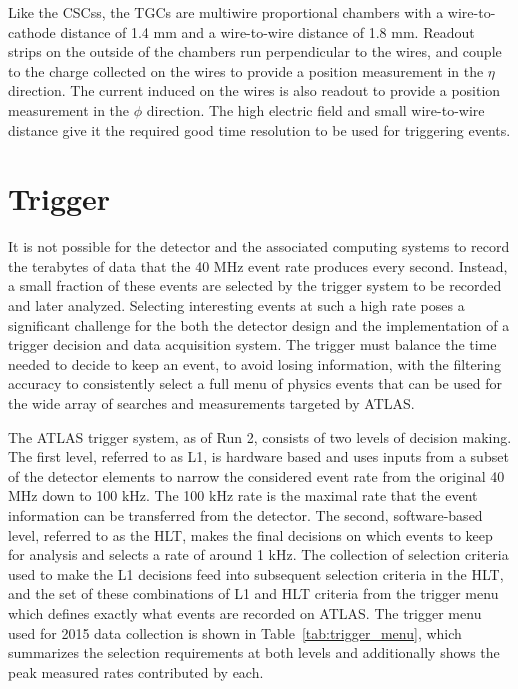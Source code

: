 Like the \acp{CSC}s, the \acp{TGC} are multiwire proportional chambers with a wire-to-cathode distance of 1.4 mm and a wire-to-wire distance of 1.8 mm.
Readout strips on the outside of the chambers run perpendicular to the wires, and couple to the charge collected on the wires to provide a position measurement in the $\eta$ direction.
The current induced on the wires is also readout to provide a position measurement in the $\phi$ direction.
The high electric field and small wire-to-wire distance give it the required good time resolution to be used for triggering events. 


\section{Trigger}
\label{sec:trigger}

It is not possible for the detector and the associated computing systems to record the terabytes of data that the 40 MHz event rate produces every second.
Instead, a small fraction of these events are selected by the trigger system to be recorded and later analyzed.
Selecting interesting events at such a high rate poses a significant challenge for the both the detector design and the implementation of a trigger decision and data acquisition system.
The trigger must balance the time needed to decide to keep an event, to avoid losing information, with the filtering accuracy to consistently select a full menu of physics events that can be used for the wide array of searches and measurements targeted by \ac{ATLAS}. 

The \ac{ATLAS} trigger system, as of Run 2, consists of two levels of decision making. 
The first level, referred to as L1, is hardware based and uses inputs from a subset of the detector elements to narrow the considered event rate from the original 40 MHz down to 100 kHz.
The 100 kHz rate is the maximal rate that the event information can be transferred from the detector.
The second, software-based level, referred to as the \ac{HLT}, makes the final decisions on which events to keep for analysis and selects a rate of around 1 kHz.
The collection of selection criteria used to make the L1 decisions feed into subsequent selection criteria in the \ac{HLT}, and the set of these combinations of L1 and \ac{HLT} criteria from the trigger menu which defines exactly what events are recorded on \ac{ATLAS}.
The trigger menu used for 2015 data collection is shown in Table~\ref{tab:trigger_menu}, which summarizes the selection requirements at both levels and additionally shows the peak measured rates contributed by each.

